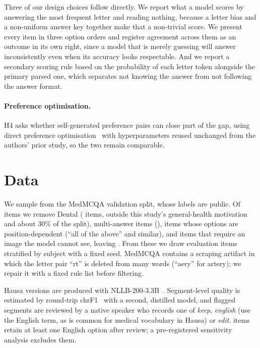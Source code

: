 \documentclass[11pt,a4paper]{article}
\begin{document}
Three of our design choices follow directly. We report what a model scores by
answering the most frequent letter and reading nothing, because a letter bias
and a non-uniform answer key together make that a non-trivial score. We present
every item in three option orders and register agreement across them as an
outcome in its own right, since a model that is merely guessing will answer
inconsistently even when its accuracy looks respectable. And we report a
secondary scoring rule based on the probability of each letter token alongside
the primary parsed one, which separates not knowing the answer from not
following the answer format.

\paragraph{Preference optimisation.}
H4 asks whether self-generated preference pairs can close part of the gap, using
direct preference optimisation~\cite{rafailov2023dpo} with hyperparameters
reused unchanged from the authors' prior study, so the two remain comparable.

\section{Data}

We sample from the MedMCQA validation split, whose labels are public. Of
\PoolStart{} items we remove Dental (\ExclDental{} items, outside this study's
general-health motivation and about 30\% of the split), multi-answer items
(\ExclMultiAnswer{}), items whose options are position-dependent (``all of the
above'' and similar), and items that require an image the model cannot see,
leaving \PoolRemaining{}. From these we draw \NEval{} evaluation items stratified
by subject with a fixed seed. MedMCQA contains a scraping artifact in which the
letter pair ``rt'' is deleted from many words (``aery'' for artery); we repair it
with a fixed rule list before filtering.

Hausa versions are produced with NLLB-200-3.3B~\cite{nllb2022}. Segment-level quality is
estimated by round-trip chrF1~\cite{popovic2015chrf} with a second, distilled model, and flagged
segments are reviewed by a native speaker who records one of \emph{keep},
\emph{english} (use the English term, as is common for medical vocabulary in
Hausa) or \emph{edit}. \FallbackItems{} items retain at least one English option
after review; a pre-registered sensitivity analysis excludes them.
\end{document}
